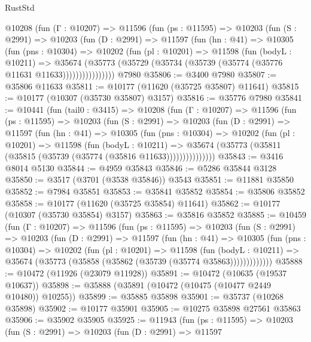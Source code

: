 \begin{lexlean}{RustStd}
\begin{coremodule}
      @10208
        (fun (Γ : @10207) =>
        @11596
          (fun (ps : @11595) =>
          @10203
            (fun (S : @2991) =>
            @10203
              (fun (D : @2991) =>
              @11597
                (fun (hn : @41) =>
                @10305
                  (fun (pns : @10304) =>
                  @10202
                    (fun (pl : @10201) =>
                    @11598
                      (fun (bodyL : @10211) =>
                      @35674
                        (@35773
                          (@35729 (@35734 (@35739 (@35774 (@35776 @11631 @11633))))))))))))))))
    @7980
@35806 := @3400 @7980
@35807 := @35806 @11633
@35811 := @10177 (@11620 (@35725 @35807) @11641)
@35815 := @10177 (@10307 (@35730 @35807) @3157)
@35816 := @35776 @7980
@35841 := @10441
    (fun (tail0 : @3415) =>
    @10208
      (fun (Γ : @10207) =>
      @11596
        (fun (ps : @11595) =>
        @10203
          (fun (S : @2991) =>
          @10203
            (fun (D : @2991) =>
            @11597
              (fun (hn : @41) =>
              @10305
                (fun (pns : @10304) =>
                @10202
                  (fun (pl : @10201) =>
                  @11598
                    (fun (bodyL : @10211) =>
                    @35674 (@35773 (@35811 (@35815 (@35739 (@35774 (@35816 @11633)))))))))))))))
@35843 := @3416 @8014 @5130
@35844 := @4959 @35843
@35846 := @5286 @35844 @3128
@35850 := @3517 (@3701 (@3538 @35846)) @3543
@35851 := @11881 @35850
@35852 := @7984 @35851
@35853 := @35841 @35852
@35854 := @35806 @35852
@35858 := @10177 (@11620 (@35725 @35854) @11641)
@35862 := @10177 (@10307 (@35730 @35854) @3157)
@35863 := @35816 @35852
@35885 := @10459
    (fun (Γ : @10207) =>
    @11596
      (fun (ps : @11595) =>
      @10203
        (fun (S : @2991) =>
        @10203
          (fun (D : @2991) =>
          @11597
            (fun (hn : @41) =>
            @10305
              (fun (pns : @10304) =>
              @10202
                (fun (pl : @10201) =>
                @11598
                  (fun (bodyL : @10211) =>
                  @35674 (@35773 (@35858 (@35862 (@35739 (@35774 @35863)))))))))))))
@35888 := @10472 (@11926 (@23079 @11928))
@35891 := @10472 (@10635 (@19537 @10637))
@35898 := @35888 (@35891 (@10472 (@10475 (@10477 @2449 @10480)) @10255))
@35899 := @35885 @35898
@35901 := @35737 (@10268 @35898)
@35902 := @10177 @35901
@35905 := @10275 @35898 @27561 @35863
@35906 := @35902 @35905
@35925 := @11943
    (fun (ps : @11595) =>
    @10203
      (fun (S : @2991) =>
      @10203
        (fun (D : @2991) =>
        @11597

\end{coremodule}
\end{lexlean}
